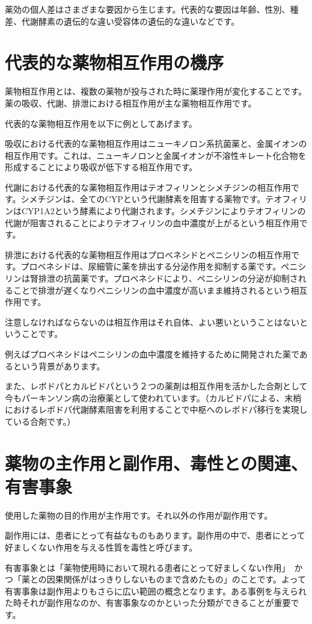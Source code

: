 \documentclass[a4paper,papersize,dvipdfmx]{jsarticle}
\begin{document}
薬効の個人差はさまざまな要因から生じます。代表的な要因は年齢、性別、種差、代謝酵素の遺伝的な違い受容体の遺伝的な違いなどです。

\section{代表的な薬物相互作用の機序}


薬物相互作用とは、複数の薬物が投与された時に薬理作用が変化することです。
薬の吸収、代謝、排泄における相互作用が主な薬物相互作用です。

代表的な薬物相互作用を以下に例としてあげます。

吸収における代表的な薬物相互作用はニューキノロン系抗菌薬と、金属イオンの相互作用です。これは、ニューキノロンと金属イオンが不溶性キレート化合物を形成することにより吸収が低下する相互作用です。


代謝における代表的な薬物相互作用はテオフィリンとシメチジンの相互作用です。シメチジンは、全てのCYPという代謝酵素を阻害する薬物です。テオフィリンはCYP1A2という酵素により代謝されます。シメチジンによりテオフィリンの代謝が阻害されることによりテオフィリンの血中濃度が上がるという相互作用です。

排泄における代表的な薬物相互作用はプロベネシドとペニシリンの相互作用です。プロベネシドは、尿細管に薬を排出する分泌作用を抑制する薬です。ペニシリンは腎排泄の抗菌薬です。プロベネシドにより、ペニシリンの分泌が抑制されることで排泄が遅くなりペニシリンの血中濃度が高いまま維持されるという相互作用です。

注意しなければならないのは相互作用はそれ自体、よい悪いということはないということです。

例えばプロベネシドはペニシリンの血中濃度を維持するために開発された薬であるという背景があります。

また、レボドパとカルビドパという２つの薬剤は相互作用を活かした合剤として今もパーキンソン病の治療薬として使われています。（カルビドパによる、末梢におけるレボドパ代謝酵素阻害を利用することで中枢へのレボドパ移行を実現している合剤です。）

\section{薬物の主作用と副作用、毒性との関連、有害事象}

使用した薬物の目的作用が主作用です。それ以外の作用が副作用です。

副作用には、患者にとって有益なものもあります。副作用の中で、患者にとって好ましくない作用を与える性質を毒性と呼びます。

有害事象とは「薬物使用時において現れる患者にとって好ましくない作用」　かつ「薬との因果関係がはっきりしないものまで含めたもの」のことです。よって有害事象は副作用よりもさらに広い範囲の概念となります。ある事例を与えられた時それが副作用なのか、有害事象なのかといった分類ができることが重要です。
\end{document}
